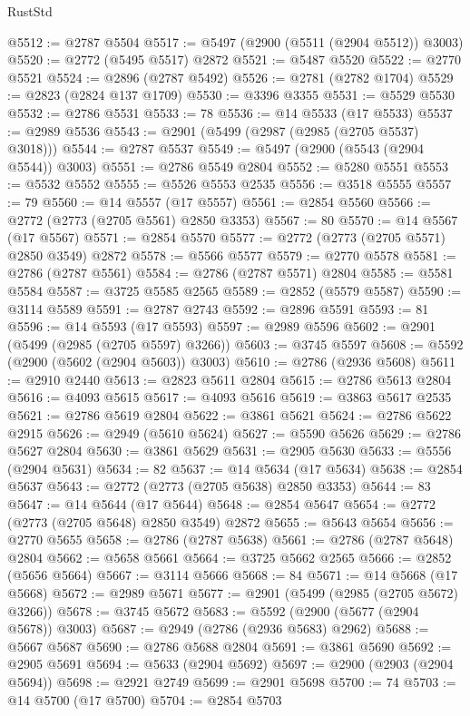 \begin{lexlean}{RustStd}
\begin{coremodule}
@5512 := @2787 @5504
@5517 := @5497 (@2900 (@5511 (@2904 @5512)) @3003)
@5520 := @2772 (@5495 @5517) @2872
@5521 := @5487 @5520
@5522 := @2770 @5521
@5524 := @2896 (@2787 @5492)
@5526 := @2781 (@2782 @1704)
@5529 := @2823 (@2824 @137 @1709)
@5530 := @3396 @3355
@5531 := @5529 @5530
@5532 := @2786 @5531
@5533 := 78
@5536 := @14 @5533 (@17 @5533)
@5537 := @2989 @5536
@5543 := @2901 (@5499 (@2987 (@2985 (@2705 @5537) @3018)))
@5544 := @2787 @5537
@5549 := @5497 (@2900 (@5543 (@2904 @5544)) @3003)
@5551 := @2786 @5549 @2804
@5552 := @5280 @5551
@5553 := @5532 @5552
@5555 := @5526 @5553 @2535
@5556 := @3518 @5555
@5557 := 79
@5560 := @14 @5557 (@17 @5557)
@5561 := @2854 @5560
@5566 := @2772 (@2773 (@2705 @5561) @2850 @3353)
@5567 := 80
@5570 := @14 @5567 (@17 @5567)
@5571 := @2854 @5570
@5577 := @2772 (@2773 (@2705 @5571) @2850 @3549) @2872
@5578 := @5566 @5577
@5579 := @2770 @5578
@5581 := @2786 (@2787 @5561)
@5584 := @2786 (@2787 @5571) @2804
@5585 := @5581 @5584
@5587 := @3725 @5585 @2565
@5589 := @2852 (@5579 @5587)
@5590 := @3114 @5589
@5591 := @2787 @2743
@5592 := @2896 @5591
@5593 := 81
@5596 := @14 @5593 (@17 @5593)
@5597 := @2989 @5596
@5602 := @2901 (@5499 (@2985 (@2705 @5597) @3266))
@5603 := @3745 @5597
@5608 := @5592 (@2900 (@5602 (@2904 @5603)) @3003)
@5610 := @2786 (@2936 @5608)
@5611 := @2910 @2440
@5613 := @2823 @5611 @2804
@5615 := @2786 @5613 @2804
@5616 := @4093 @5615
@5617 := @4093 @5616
@5619 := @3863 @5617 @2535
@5621 := @2786 @5619 @2804
@5622 := @3861 @5621
@5624 := @2786 @5622 @2915
@5626 := @2949 (@5610 @5624)
@5627 := @5590 @5626
@5629 := @2786 @5627 @2804
@5630 := @3861 @5629
@5631 := @2905 @5630
@5633 := @5556 (@2904 @5631)
@5634 := 82
@5637 := @14 @5634 (@17 @5634)
@5638 := @2854 @5637
@5643 := @2772 (@2773 (@2705 @5638) @2850 @3353)
@5644 := 83
@5647 := @14 @5644 (@17 @5644)
@5648 := @2854 @5647
@5654 := @2772 (@2773 (@2705 @5648) @2850 @3549) @2872
@5655 := @5643 @5654
@5656 := @2770 @5655
@5658 := @2786 (@2787 @5638)
@5661 := @2786 (@2787 @5648) @2804
@5662 := @5658 @5661
@5664 := @3725 @5662 @2565
@5666 := @2852 (@5656 @5664)
@5667 := @3114 @5666
@5668 := 84
@5671 := @14 @5668 (@17 @5668)
@5672 := @2989 @5671
@5677 := @2901 (@5499 (@2985 (@2705 @5672) @3266))
@5678 := @3745 @5672
@5683 := @5592 (@2900 (@5677 (@2904 @5678)) @3003)
@5687 := @2949 (@2786 (@2936 @5683) @2962)
@5688 := @5667 @5687
@5690 := @2786 @5688 @2804
@5691 := @3861 @5690
@5692 := @2905 @5691
@5694 := @5633 (@2904 @5692)
@5697 := @2900 (@2903 (@2904 @5694))
@5698 := @2921 @2749
@5699 := @2901 @5698
@5700 := 74
@5703 := @14 @5700 (@17 @5700)
@5704 := @2854 @5703

\end{coremodule}
\end{lexlean}
